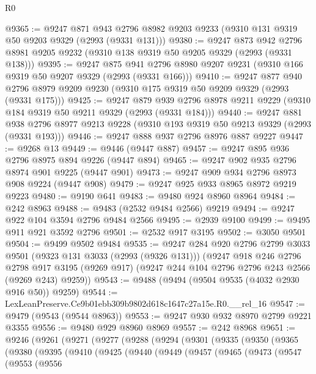 \begin{lexlean}{R0}
\begin{coremodule}
@9365 := @9247
    @871
    @943
    @2796
    @8982
    @9203
    @9233
    (@9310 @131 @9319 @50 @9203 @9329 (@2993 (@9331 @131)))
@9380 := @9247
    @873
    @942
    @2796
    @8981
    @9205
    @9232
    (@9310 @138 @9319 @50 @9205 @9329 (@2993 (@9331 @138)))
@9395 := @9247
    @875
    @941
    @2796
    @8980
    @9207
    @9231
    (@9310 @166 @9319 @50 @9207 @9329 (@2993 (@9331 @166)))
@9410 := @9247
    @877
    @940
    @2796
    @8979
    @9209
    @9230
    (@9310 @175 @9319 @50 @9209 @9329 (@2993 (@9331 @175)))
@9425 := @9247
    @879
    @939
    @2796
    @8978
    @9211
    @9229
    (@9310 @184 @9319 @50 @9211 @9329 (@2993 (@9331 @184)))
@9440 := @9247
    @881
    @938
    @2796
    @8977
    @9213
    @9228
    (@9310 @193 @9319 @50 @9213 @9329 (@2993 (@9331 @193)))
@9446 := @9247 @888 @937 @2796 @8976 @887 @9227
@9447 := @9268 @13
@9449 := @9446 (@9447 @887)
@9457 := @9247 @895 @936 @2796 @8975 @894 @9226 (@9447 @894)
@9465 := @9247 @902 @935 @2796 @8974 @901 @9225 (@9447 @901)
@9473 := @9247 @909 @934 @2796 @8973 @908 @9224 (@9447 @908)
@9479 := @9247 @925 @933 @8965 @8972 @9219 @9223
@9480 := @9190 @641
@9483 := @9480 @924 @8960 @8964
@9484 := @242 @8963
@9488 := @9483 (@2532 @9484 @2566) @9219
@9494 := @9247 @922 @104 @3594 @2796 @9484 @2566
@9495 := @2939 @9100
@9499 := @9495 @911 @921 @3592 @2796
@9501 := @2532 @917 @3195
@9502 := @3050 @9501
@9504 := @9499 @9502 @9484
@9535 := @9247
    @284
    @920
    @2796
    @2799
    @3033
    @9501
    (@9323 @131 @3033 (@2993 (@9326 @131)))
    (@9247
      @918
      @246
      @2796
      @2798
      @917
      @3195
      (@9269 @917)
      (@9247 @244 @104 @2796 @2796 @243 @2566 (@9269 @243) @9259))
@9543 := @9488 (@9494 (@9504 @9535 (@4032 @2930 @916 @50)) @9259)
@9544 := LexLeanPreserve.Ce9b01ebb309b9802d618c1647c27a15e.R0.__rel_16
@9547 := @9479 (@9543 (@9544 @8963))
@9553 := @9247 @930 @932 @8970 @2799 @9221 @3355
@9556 := @9480 @929 @8960 @8969
@9557 := @242 @8968
@9651 := @9246
    (@9261
      (@9271
        (@9277
          (@9288
            (@9294
              (@9301
                (@9335
                  (@9350
                    (@9365
                      (@9380
                        (@9395
                          (@9410
                            (@9425
                              (@9440
                                (@9449
                                  (@9457
                                    (@9465
                                      (@9473
                                        (@9547
                                          (@9553
                                            (@9556

\end{coremodule}
\end{lexlean}
